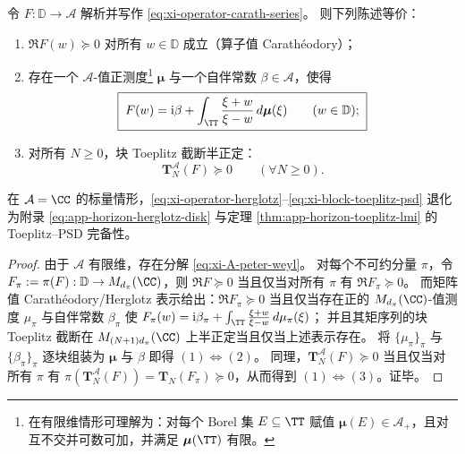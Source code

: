 \begin{theorem}\label{thm:xi-operator-herglotz-toeplitz-completeness}
令 \(F:\mathbb{D}\to\mathcal{A}\) 解析并写作 \eqref{eq:xi-operator-carath-series}。
则下列陈述等价：
\begin{enumerate}
  \item \(\Re F(w)\succeq 0\) 对所有 \(w\in\mathbb{D}\) 成立（算子值 Carath\'eodory）；
  \item 存在一个 \(\mathcal{A}\)-值正测度\footnote{在有限维情形可理解为：对每个 Borel 集 \(E\subseteq\TT\) 赋值 \(\boldsymbol\mu(E)\in\mathcal{A}_+\)，且对互不交并可数可加，并满足 \(\boldsymbol\mu(\TT)\) 有限。} \(\boldsymbol\mu\) 与一个自伴常数 \(\beta\in\mathcal{A}\)，使得
  \begin{equation}\label{eq:xi-operator-herglotz}
  \boxed{\;
  F(w)=\mathrm{i}\beta+\int_{\TT}\frac{\xi+w}{\xi-w}\,d\boldsymbol\mu(\xi)\qquad(w\in\mathbb{D});\;}
  \end{equation}
  \item 对所有 \(N\ge 0\)，块 Toeplitz 截断半正定：
  \begin{equation}\label{eq:xi-block-toeplitz-psd}
  \boxed{\;\mathbf{T}^{\mathcal{A}}_N(F)\succeq 0\qquad(\forall N\ge 0).\;}
  \end{equation}
\end{enumerate}
在 \(\mathcal{A}=\CC\) 的标量情形，\eqref{eq:xi-operator-herglotz}--\eqref{eq:xi-block-toeplitz-psd} 退化为附录 \eqref{eq:app-horizon-herglotz-disk} 与定理 \ref{thm:app-horizon-toeplitz-lmi} 的 Toeplitz--PSD 完备性。
\end{theorem}

\begin{proof}
由于 \(\mathcal{A}\) 有限维，存在分解 \eqref{eq:xi-A-peter-weyl}。
对每个不可约分量 \(\pi\)，令 \(F_\pi:=\pi(F):\mathbb{D}\to M_{d_\pi}(\CC)\)，则
\(\Re F\succeq 0\) 当且仅当对所有 \(\pi\) 有 \(\Re F_\pi\succeq 0\)。
而矩阵值 Carath\'eodory/Herglotz 表示给出：\(\Re F_\pi\succeq 0\) 当且仅当存在正的 \(M_{d_\pi}(\CC)\)-值测度 \(\mu_\pi\) 与自伴常数 \(\beta_\pi\) 使
\(
F_\pi(w)=\mathrm{i}\beta_\pi+\int_{\TT}\frac{\xi+w}{\xi-w}\,d\mu_\pi(\xi)
\)；
并且其矩序列的块 Toeplitz 截断在 \(M_{(N+1)d_\pi}(\CC)\) 上半正定当且仅当上述表示存在。
将 \(\{\mu_\pi\}_{\pi}\) 与 \(\{\beta_\pi\}_{\pi}\) 逐块组装为 \(\boldsymbol\mu\) 与 \(\beta\) 即得 \((1)\Leftrightarrow(2)\)。
同理，\(\mathbf{T}^{\mathcal{A}}_N(F)\succeq 0\) 当且仅当对所有 \(\pi\) 有 \(\pi(\mathbf{T}^{\mathcal{A}}_N(F))=\mathbf{T}_N(F_\pi)\succeq 0\)，从而得到 \((1)\Leftrightarrow(3)\)。证毕。
\end{proof}

